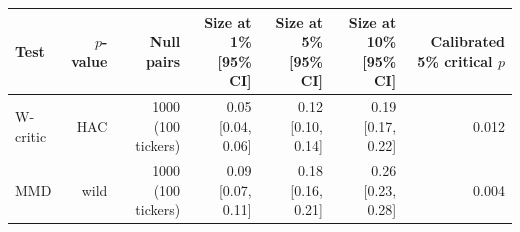 \begin{tabular}{lrrrrrr}
\toprule
Test & $p$-value & Null pairs & Size at 1\% [95\% CI] & Size at 5\% [95\% CI] & Size at 10\% [95\% CI] & Calibrated 5\% critical $p$ \\
\midrule
W-critic & HAC & 1000 (100 tickers) & 0.05 [0.04, 0.06] & 0.12 [0.10, 0.14] & 0.19 [0.17, 0.22] & 0.012 \\
MMD & wild & 1000 (100 tickers) & 0.09 [0.07, 0.11] & 0.18 [0.16, 0.21] & 0.26 [0.23, 0.28] & 0.004 \\
\bottomrule
\end{tabular}

